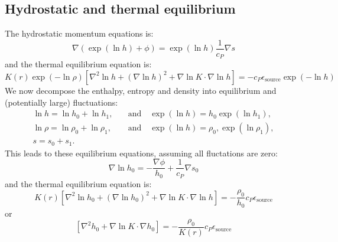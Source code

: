 \documentclass{aastex62}
\newcommand{\del}{\nabla}
\begin{document}
\subsection{Hydrostatic and thermal equilibrium}
The hydrostatic momentum equations is:
\begin{equation}
  \del (\exp(\ln h) + \phi) = \exp(\ln h)\frac{1}{c_P}\del s
\end{equation}
and the thermal equilibrium equation is:
\begin{equation}
  K(r) \exp(-\ln \rho)\left[\nabla^2 \ln h + \left(\nabla \ln h\right)^2 + \del \ln K \cdot \del \ln h \right] = - c_P \epsilon_\mathrm{source} \exp(-\ln h)
\end{equation}
We now decompose the enthalpy, entropy and density into equilibrium and (potentially large) fluctuations:
\begin{align}
  \ln h = \ln h_0 + \ln h_1, &\quad \text{and} \quad \exp(\ln h) = h_0 \exp(\ln h_1),\\
  \ln \rho = \ln \rho_0 + \ln \rho_1, &\quad \text{and} \quad \exp(\ln h) = \rho_0, \exp(\ln \rho_1),\\
  s = s_0 + s_1.
\end{align}
This leads to these equilibrium equations, assuming all fluctations are zero:
\begin{equation}
  \del \ln h_0 = -\frac{\del \phi}{h_0} + \frac{1}{c_P}\del s_0
\end{equation}
and the thermal equilibrium equation is:
\begin{equation}
  K(r) \left[\nabla^2 \ln h_0 + \left(\nabla \ln h_0\right)^2 + \del \ln K \cdot \del \ln h \right] = - \frac{\rho_0}{h_0} c_P \epsilon_\mathrm{source}
\end{equation}
or
\begin{equation}
  \left[\nabla^2 h_0 + \del \ln K \cdot \del h_0 \right] = - \frac{\rho_0}{K(r) } c_P \epsilon_\mathrm{source} 
\end{equation}
\end{document}
